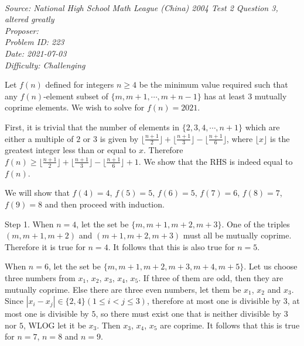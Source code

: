 \SSbreak\\
\emph{Source: National High School Math League (China) 2004 Test 2 Question 3, altered greatly}\\
\emph{Proposer: \Ptaiga}\\ %
\emph{Problem ID: 223}\\
\emph{Date: 2021-07-03}\\
\emph{Difficulty: Challenging}\\
\SSbreak

\bigskip

\begin{solution}\hfil\medskip
	
	Let $f(n)$ defined for integers $n\geq4$ be the minimum value required such that any $f(n)$-element subset of $\{m,m+1,\dotsb,m+n-1\}$ has at least $3$ mutually coprime elements. We wish to solve for $f(n)=2021$. 

First, it is trivial that the number of elements in $\{2,3,4,\dotsb,n+1\}$ which are either a multiple of $2$ or $3$ is given by $\lfloor\frac{n+1}2\rfloor+\lfloor\frac{n+1}3\rfloor-\lfloor\frac{n+1}6\rfloor$, where $\lfloor x\rfloor$ is the greatest integer less than or equal to $x$. Therefore $f(n)\geq\lfloor\frac{n+1}2\rfloor+\lfloor\frac{n+1}3\rfloor-\lfloor\frac{n+1}6\rfloor+1$. We show that the RHS is indeed equal to $f(n)$.

We will show that $f(4)=4$, $f(5)=5$, $f(6)=5$, $f(7)=6$, $f(8)=7$, $f(9)=8$ and then proceed with induction.

Step 1. When $n=4$, let the set be $\{m,m+1,m+2,m+3\}$. One of the triples $(m,m+1,m+2)$ and $(m+1,m+2,m+3)$ must all be mutually coprime. Therefore it is true for $n=4$. It follows that this is also true for $n=5$.

When $n=6$, let the set be $\{m,m+1,m+2,m+3,m+4,m+5\}$. Let us choose three numbers from $x_1$, $x_2$, $x_3$, $x_4$, $x_5$. If three of them are odd, then they are mutually coprime. Else there are three even numbers, let them be $x_1$, $x_2$ and $x_3$. Since $|x_i-x_j|\in\{2,4\}(1\leq i<j\leq3)$, therefore at most one is divisible by $3$, at most one is divisible by $5$, so there must exist one that is neither divisible by $3$ nor $5$, WLOG let it be $x_3$. Then $x_3$, $x_4$, $x_5$ are coprime. It follows that this is true for $n=7$, $n=8$ and $n=9$.


\end{solution}
